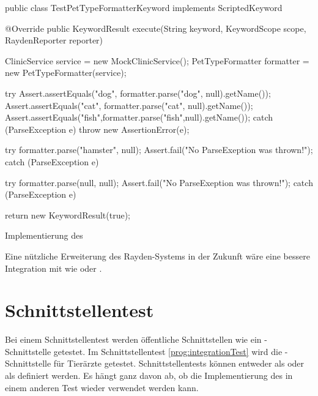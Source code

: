 \begin{program}
\begin{JavaCode}
public class TestPetTypeFormatterKeyword implements ScriptedKeyword {

  @Override
  public KeywordResult execute(String keyword, KeywordScope scope, RaydenReporter reporter) {
    ClinicService service = new MockClinicService();
    PetTypeFormatter formatter = new PetTypeFormatter(service);

    try {
     Assert.assertEquals("dog", formatter.parse("dog", null).getName());
     Assert.assertEquals("cat", formatter.parse("cat", null).getName());
     Assert.assertEquals("fish",formatter.parse("fish",null).getName());
    } catch (ParseException e) {
      throw new AssertionError(e);
    }
    
    try {
      formatter.parse("hamster", null);
      Assert.fail("No ParseExeption was thrown!");
    } catch (ParseException e) {
    }

    try {
      formatter.parse(null, null);
      Assert.fail("No ParseExeption was thrown!");
    } catch (ParseException e) {
    }

    return new KeywordResult(true);
  }
}
\end{JavaCode}
\caption{Implementierung des  }
\label{prog:unitTestImpl}
\end{program}

\SuperPar
Eine nützliche Erweiterung des Rayden-Systems in der Zukunft wäre eine bessere Integration mit  wie  oder .

\section{Schnittstellentest}
\label{cha:TestenApi}

Bei einem Schnittstellentest werden öffentliche Schnittstellen wie ein -Schnittstelle \cite{Rest} getestet. Im Schnittstellentest \ref{prog:integrationTest} wird die -Schnittstelle für Tierärzte getestet. Schnittstellentests können entweder als  oder als  definiert werden. Es hängt ganz davon ab, ob die Implementierung des  in einem anderen Test wieder verwendet werden kann. 

